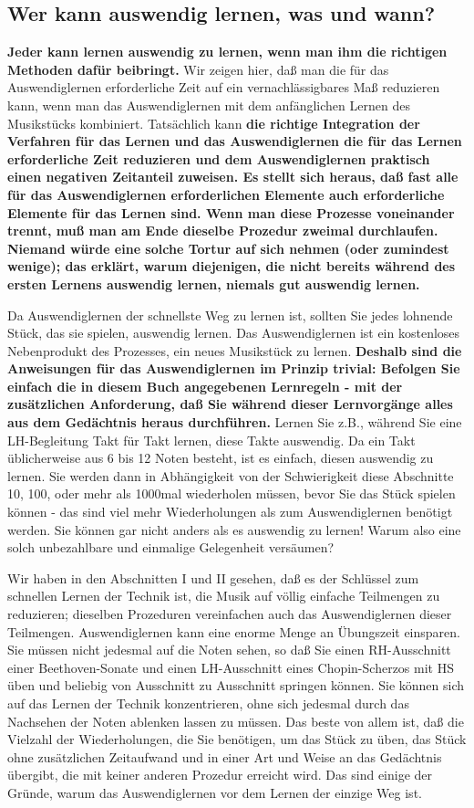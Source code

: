 \subsection{Wer kann auswendig lernen, was und wann?}\hypertarget{c1iii6b}{}

\textbf{Jeder kann lernen auswendig zu lernen, wenn man ihm die richtigen Methoden dafür beibringt.}
Wir zeigen hier, daß man die für das Auswendiglernen erforderliche Zeit auf ein vernachlässigbares Maß reduzieren kann, wenn man das Auswendiglernen mit dem anfänglichen Lernen des Musikstücks kombiniert.
Tatsächlich kann \textbf{die richtige Integration der Verfahren für das Lernen und das Auswendiglernen die für das Lernen erforderliche Zeit reduzieren und dem Auswendiglernen praktisch einen negativen Zeitanteil zuweisen.
Es stellt sich heraus, daß fast alle für das Auswendiglernen erforderlichen Elemente auch erforderliche Elemente für das Lernen sind.
Wenn man diese Prozesse voneinander trennt, muß man am Ende dieselbe Prozedur zweimal durchlaufen.
Niemand würde eine solche Tortur auf sich nehmen (oder zumindest wenige); das erklärt, warum diejenigen, die nicht bereits während des ersten Lernens auswendig lernen, niemals gut auswendig lernen.}

Da Auswendiglernen der schnellste Weg zu lernen ist, sollten Sie jedes lohnende Stück, das sie spielen, auswendig lernen.
Das Auswendiglernen ist ein kostenloses Nebenprodukt des Prozesses, ein neues Musikstück zu lernen.
\textbf{Deshalb sind die Anweisungen für das Auswendiglernen im Prinzip trivial: Befolgen Sie einfach die in diesem Buch angegebenen Lernregeln - mit der zusätzlichen Anforderung, daß Sie während dieser Lernvorgänge alles aus dem Gedächtnis heraus durchführen.}
Lernen Sie z.B., während Sie eine LH-Begleitung Takt für Takt lernen, diese Takte auswendig.
Da ein Takt üblicherweise aus 6 bis 12 Noten besteht, ist es einfach, diesen auswendig zu lernen.
Sie werden dann in Abhängigkeit von der Schwierigkeit diese Abschnitte 10, 100, oder mehr als 1000mal wiederholen müssen, bevor Sie das Stück spielen können - das sind viel mehr Wiederholungen als zum Auswendiglernen benötigt werden.
Sie können gar nicht anders als es auswendig zu lernen!
Warum also eine solch unbezahlbare und einmalige Gelegenheit versäumen?

Wir haben in den Abschnitten I und II gesehen, daß es der Schlüssel zum schnellen Lernen der Technik ist, die Musik auf völlig einfache Teilmengen zu reduzieren; dieselben Prozeduren vereinfachen auch das Auswendiglernen dieser Teilmengen.
Auswendiglernen kann eine enorme Menge an Übungszeit einsparen.
Sie müssen nicht jedesmal auf die Noten sehen, so daß Sie einen RH-Ausschnitt einer Beethoven-Sonate und einen LH-Ausschnitt eines Chopin-Scherzos mit HS üben und beliebig von Ausschnitt zu Ausschnitt springen können.
Sie können sich auf das Lernen der Technik konzentrieren, ohne sich jedesmal durch das Nachsehen der Noten ablenken lassen zu müssen.
Das beste von allem ist, daß die Vielzahl der Wiederholungen, die Sie benötigen, um das Stück zu üben, das Stück ohne zusätzlichen Zeitaufwand und in einer Art und Weise an das Gedächtnis übergibt, die mit keiner anderen Prozedur erreicht wird.
Das sind einige der Gründe, warum das Auswendiglernen vor dem Lernen der einzige Weg ist.

